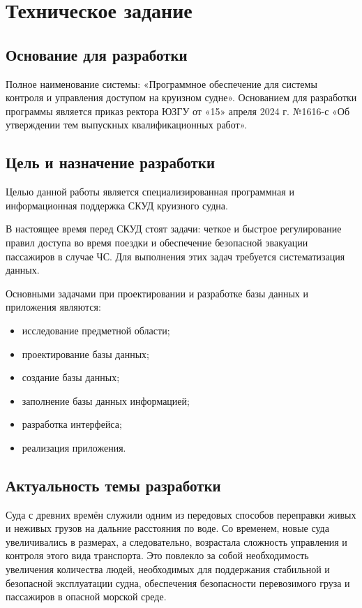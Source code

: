 \section{Техническое задание}
\subsection{Основание для разработки}

Полное наименование системы: «Программное обеспечение для системы контроля и управления доступом на круизном судне».
Основанием для разработки программы является приказ ректора ЮЗГУ от «15» апреля 2024 г. №1616-с «Об утверждении тем выпускных квалификационных работ».

\subsection{Цель и назначение разработки}

Целью данной работы является специализированная программная и информационная поддержка СКУД круизного судна.

В настоящее время перед СКУД стоят задачи: четкое и быстрое регулирование правил доступа во время поездки и обеспечение безопасной эвакуации пассажиров в случае ЧС. Для выполнения этих задач требуется систематизация данных. 

Основными задачами при проектировании и разработке базы данных  и приложения являются:
\begin{itemize}
	\item исследование предметной области;
	\item проектирование базы данных;
	\item создание базы данных;
	\item заполнение базы данных информацией;
	\item разработка  интерфейса;
	\item реализация приложения.
\end{itemize}

\subsection{Актуальность темы разработки}
Суда с древних времён служили одним из передовых способов переправки живых и неживых грузов на дальние расстояния по воде. Со временем, новые суда увеличивались в размерах, а следовательно, возрастала сложность управления и контроля этого вида транспорта. Это повлекло за собой необходимость увеличения количества людей, необходимых для поддержания стабильной и безопасной эксплуатации судна, обеспечения безопасности перевозимого груза и пассажиров в опасной морской среде.

